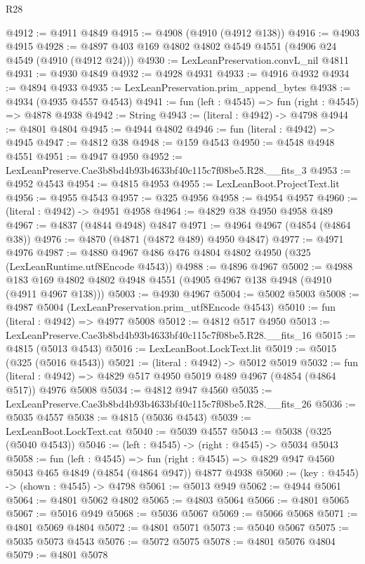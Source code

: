 \begin{lexlean}{R28}
\begin{coremodule}
@4912 := @4911 @4849
@4915 := @4908 (@4910 (@4912 @138))
@4916 := @4903 @4915
@4928 := @4897 @403 @169 @4802 @4802 @4549 @4551 (@4906 @24 @4549 (@4910 (@4912 @24)))
@4930 := LexLeanPreservation.convL_nil @4811
@4931 := @4930 @4849
@4932 := @4928 @4931
@4933 := @4916 @4932
@4934 := @4894 @4933
@4935 := LexLeanPreservation.prim_append_bytes
@4938 := @4934 (@4935 @4557 @4543)
@4941 := fun (left : @4545) => fun (right : @4545) => @4878 @4938
@4942 := String
@4943 := (literal : @4942) -> @4798
@4944 := @4801 @4804
@4945 := @4944 @4802
@4946 := fun (literal : @4942) => @4945
@4947 := @4812 @38
@4948 := @159 @4543
@4950 := @4548 @4948 @4551
@4951 := @4947 @4950
@4952 := LexLeanPreserve.Cae3b8bd4b93b4633bf40c115c7f08be5.R28.__fits_3
@4953 := @4952 @4543
@4954 := @4815 @4953
@4955 := LexLeanBoot.ProjectText.lit
@4956 := @4955 @4543
@4957 := @325 @4956
@4958 := @4954 @4957
@4960 := (literal : @4942) -> @4951 @4958
@4964 := @4829 @38 @4950 @4958 @489
@4967 := @4837 (@4844 @4948) @4847
@4971 := @4964 @4967 (@4854 (@4864 @38))
@4976 := @4870 (@4871 (@4872 @489) @4950 @4847)
@4977 := @4971 @4976
@4987 := @4880 @4967 @486 @476 @4804 @4802 @4950 (@325 (LexLeanRuntime.utf8Encode @4543))
@4988 := @4896 @4967
@5002 := @4988 @183 @169 @4802 @4802 @4948 @4551 (@4905 @4967 @138 @4948 (@4910 (@4911 @4967 @138)))
@5003 := @4930 @4967
@5004 := @5002 @5003
@5008 := @4987 @5004 (LexLeanPreservation.prim_utf8Encode @4543)
@5010 := fun (literal : @4942) => @4977 @5008
@5012 := @4812 @517 @4950
@5013 := LexLeanPreserve.Cae3b8bd4b93b4633bf40c115c7f08be5.R28.__fits_16
@5015 := @4815 (@5013 @4543)
@5016 := LexLeanBoot.LockText.lit
@5019 := @5015 (@325 (@5016 @4543))
@5021 := (literal : @4942) -> @5012 @5019
@5032 := fun (literal : @4942) => @4829 @517 @4950 @5019 @489 @4967 (@4854 (@4864 @517)) @4976 @5008
@5034 := @4812 @947 @4560
@5035 := LexLeanPreserve.Cae3b8bd4b93b4633bf40c115c7f08be5.R28.__fits_26
@5036 := @5035 @4557
@5038 := @4815 (@5036 @4543)
@5039 := LexLeanBoot.LockText.cat
@5040 := @5039 @4557
@5043 := @5038 (@325 (@5040 @4543))
@5046 := (left : @4545) -> (right : @4545) -> @5034 @5043
@5058 := fun (left : @4545) =>
  fun (right : @4545) => @4829 @947 @4560 @5043 @465 @4849 (@4854 (@4864 @947)) @4877 @4938
@5060 := (key : @4545) -> (shown : @4545) -> @4798
@5061 := @5013 @949
@5062 := @4944 @5061
@5064 := @4801 @5062 @4802
@5065 := @4803 @5064
@5066 := @4801 @5065
@5067 := @5016 @949
@5068 := @5036 @5067
@5069 := @5066 @5068
@5071 := @4801 @5069 @4804
@5072 := @4801 @5071
@5073 := @5040 @5067
@5075 := @5035 @5073 @4543
@5076 := @5072 @5075
@5078 := @4801 @5076 @4804
@5079 := @4801 @5078

\end{coremodule}
\end{lexlean}

